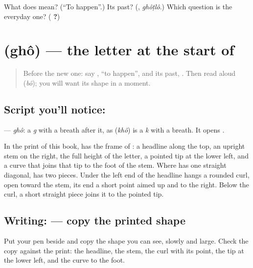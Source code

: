 \begin{tcolorbox}[breakable,colback=teal!4,colframe=teal!35!black,title={Before you move on}]
What does \textbf{} mean? (\textquotedblleft{}To happen\textquotedblright{}.) Its past? (\textbf{}, \emph{ghôṭlô}.) Which question is the everyday one? (\textbf{ ?})
\end{tcolorbox}
\section[\texorpdfstring{\bn{ঘ} (ghô)}{ঘ (ghô)}]{ (ghô) — the letter at the start of }

\label{lesson:BN-W264-letter-gha}



\begin{quote}
Before the new one: say \textbf{}, \textquotedblleft{}to happen\textquotedblright{}, and its past, \textbf{}. Then read \textbf{} aloud (\emph{bô}); you will want its shape in a moment.
\end{quote}

\subsection*{Script you'll notice: }
\textbf{} — \emph{ghô}: a \emph{g} with a breath after it, as \textbf{} (\emph{khô}) is a \emph{k} with a breath. It opens \textbf{}.

In the print of this book, \textbf{} has the frame of \textbf{}: a headline along the top, an upright stem on the right, the full height of the letter, a pointed tip at the lower left, and a curve that joins that tip to the foot of the stem. Where \textbf{} has one straight diagonal, \textbf{} has two pieces. Under the left end of the headline hangs a rounded curl, open toward the stem, its end a short point aimed up and to the right. Below the curl, a short straight piece joins it to the pointed tip.

\subsection*{Writing:  — copy the printed shape}
Put your pen beside \textbf{} and copy the shape you can see, slowly and large. Check the copy against the print: the headline, the stem, the curl with its point, the tip at the lower left, and the curve to the foot.

